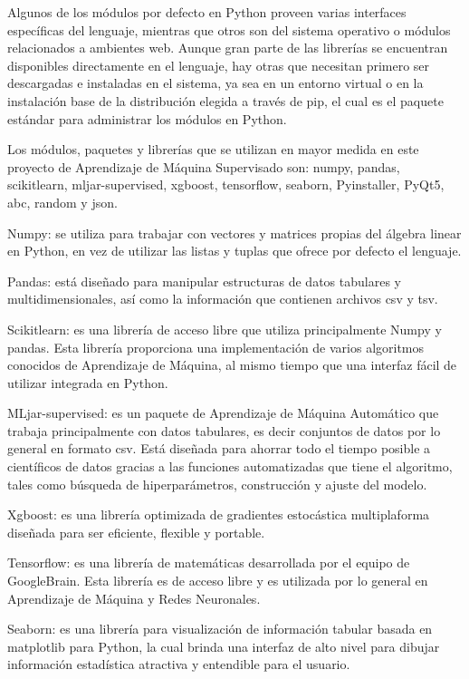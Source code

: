 Algunos de los módulos por defecto en Python proveen varias interfaces específicas del lenguaje, mientras que otros son del sistema operativo o módulos relacionados a ambientes web. Aunque gran parte de las librerías se encuentran disponibles directamente en el lenguaje, hay otras que necesitan primero ser descargadas e instaladas en el sistema, ya sea en un entorno virtual o en la instalación base de la distribución elegida a través de pip, el cual es el paquete estándar para administrar los módulos en Python.

Los módulos, paquetes y librerías que se utilizan en mayor medida en este proyecto de Aprendizaje de Máquina Supervisado son: numpy, pandas, scikitlearn, mljar-supervised, xgboost, tensorflow, seaborn, Pyinstaller, PyQt5, abc, random y json. 

\begin{APAitemize}
    \item Numpy: se utiliza para trabajar con vectores y matrices propias del álgebra linear en Python, en vez de utilizar las listas y tuplas que ofrece por defecto el lenguaje.
    \item Pandas: está diseñado para manipular estructuras de datos tabulares y multidimensionales, así como la información que contienen archivos csv y tsv.
    \item Scikitlearn: es una librería de acceso libre que utiliza principalmente Numpy y pandas. Esta librería proporciona una implementación de varios algoritmos conocidos de Aprendizaje de Máquina, al mismo tiempo que una interfaz fácil de utilizar integrada en Python.
    \item MLjar-supervised: es un paquete de Aprendizaje de Máquina Automático que trabaja principalmente con datos tabulares, es decir conjuntos de datos por lo general en formato csv. Está diseñada para ahorrar todo el tiempo posible a científicos de datos gracias a las funciones automatizadas que tiene el algoritmo, tales como búsqueda de hiperparámetros, construcción y ajuste del modelo.
    \item Xgboost: es una librería optimizada de gradientes estocástica multiplaforma diseñada para ser eficiente, flexible y portable.
    \item Tensorflow: es una librería de matemáticas desarrollada por el equipo de GoogleBrain. Esta librería es de acceso libre y es utilizada por lo general en Aprendizaje de Máquina y Redes Neuronales.
    \item Seaborn: es una librería para visualización de información tabular basada en matplotlib para Python, la cual brinda una interfaz de alto nivel para dibujar información estadística atractiva y entendible para el usuario.

\end{APAitemize}
